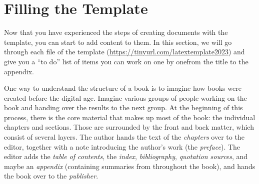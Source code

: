 

\chapter{Filling the Template}
\label{fillingthetemplate:cha}

Now that you have experienced the steps of creating documents with the template, you can start to add content to them. In this section, we will go through each file of the template (\url{https://tinyurl.com/latextemplate2023}) and give you a ``to do'' list of items you can work on one by one\emdash{}from the title to the appendix.

One way to understand the structure of a book is to imagine how books were created before the digital age. Imagine various groups of people working on the book and handing over the results to the next group. At the beginning of this process, there is the core material that makes up most of the book: the individual chapters and sections. Those are surrounded by the front and back matter, which consist of several layers. The author hands the text of the \textit{chapters} over to the editor, together with a note introducing the author's work (the \textit{preface}). The editor adds the \textit{table of contents}, the \textit{index}, \textit{bibliography}, \textit{quotation sources}, and maybe an \textit{appendix} (containing summaries from throughout the book), and hands the book over to the \textit{publisher}.

